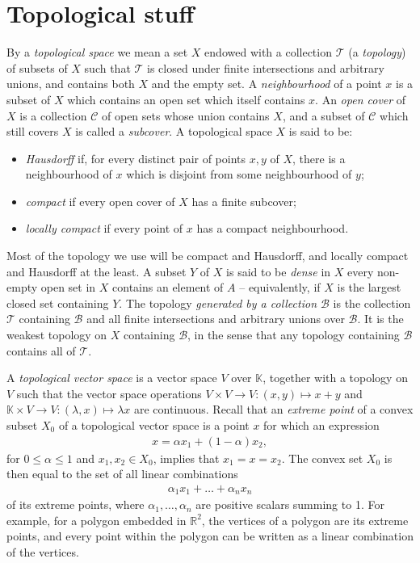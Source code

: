 \documentclass[11pt,a4paper]{report}
\theoremstyle{plain}
\theoremstyle{definition}
\newcommand{\1}{\mathbbm{1}}
\newcommand{\R}{\mathbb{R}}
\newcommand{\B}{\mathcal{B}}
\newcommand{\T}{\mathcal{T}}
\newcommand{\cover}{\mathcal{C}}
\begin{document}
\section{Topological stuff}
By a \emph{topological space} we mean a set $X$ endowed with a collection $\T$ (a \emph{topology}) of 
subsets of $X$ such that $\T$ is closed under finite intersections and arbitrary unions, and contains 
both $X$ and the empty set. A \emph{neighbourhood} of a point $x$ is a subset of $X$ which contains an 
open set which itself contains $x$. An \emph{open cover} of $X$ is a collection $\cover$ of open sets 
whose union contains $X$, and a subset of $\cover$ which still covers $X$ is called a \emph{subcover}. 
A topological space $X$ is said to be:
\begin{itemize}
	\item \emph{Hausdorff} if, for every distinct pair of points $x,y$ of $X$, there is a neighbourhood 
	of $x$ which is disjoint from some neighbourhood of $y$;
	\item \emph{compact} if every open cover of $X$ has a finite subcover;
	\item \emph{locally compact} if every point of $x$ has a compact neighbourhood.
\end{itemize}
Most of the topology we use will be compact and Hausdorff, and locally compact and Hausdorff at the 
least.
A subset $Y$ of $X$ is said to be \emph{dense} in $X$ every non-empty open set in $X$ contains an 
element of $A$ -- equivalently, if $X$ is the largest closed set containing $Y$.
The topology \emph{generated by a collection $\B$} is the collection $\T$ containing $\B$ and all finite 
intersections and arbitrary unions over $\B$. It is the weakest topology on $X$ containing $\B$, in the 
sense that any topology containing $\B$ contains all of $\T$.

A \emph{topological vector space} is a vector space $V$ over $\mathbb K$,  together with a topology on 
$V$ such that the vector space operations $V\times V\to V:(x,y)\mapsto x+y$ and $\mathbb{K}\times V\to 
V:(\lambda,x)\mapsto \lambda x$ are continuous. 
Recall that an \emph{extreme point} of a convex subset $X_0$ of a topological vector space is a point 
$x$ for which an expression
\begin{align*}
	x = \alpha x_1 +(1-\alpha)x_2,
\end{align*}
for $0\leq\alpha\leq1$ and $x_1,x_2\in X_0$, implies that $x_1=x=x_2$. 
The convex set $X_0$ is then equal to the set of all linear combinations
\begin{align*}
	\alpha_1 x_1+\dots +\alpha_n x_n
\end{align*}
of its extreme points, where $\alpha_1,\dots,\alpha_n$ are positive scalars summing to 1.
For example, for a polygon embedded in $\R^2$, the vertices of a polygon are its extreme points, and
every point within the polygon can be written as a linear combination of the vertices.
\end{document}
